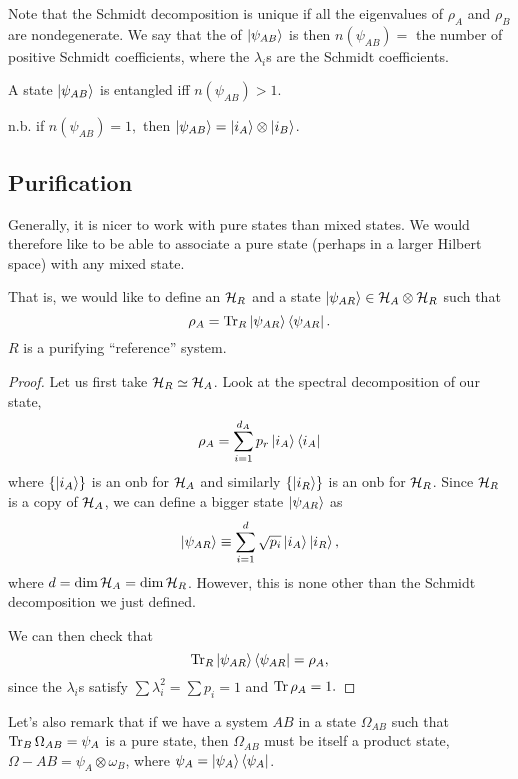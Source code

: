 Note that the Schmidt decomposition is unique if all the eigenvalues of $\rho_A$ and $\rho_B$ are nondegenerate. We say that the  of $\left| \psi_{AB} \right>$ is then $n(\psi_{AB})={}$ the number of positive Schmidt coefficients, where the $\lambda_i$s are the Schmidt coefficients.

\begin{thm}
    A state $\left| \psi_{AB} \right>$ is entangled iff $n(\psi_{AB}) >1$.
\end{thm}
n.b. if $n(\psi_{AB})=1,$ then $\left| \psi_{AB} \right>=\left| i_A \right>\otimes \left| i_B \right>$.

\subsection*{Purification} Generally, it is nicer to work with pure states than mixed states. We would therefore like to be able to associate a pure state (perhaps in a larger Hilbert space) with any mixed state.

That is, we would like to define an $\mathcal H_R$ and a state $\left| \psi_{AR} \right>\in \mathcal H_A \otimes \mathcal H_R$ such that
\begin{equation}
    \rho_A=\operatorname{Tr}_R \left| \psi_{AR} \right>\left< \psi_{AR} \right|.
\end{equation}
$R$ is a purifying ``reference'' system.
\begin{proof}
    Let us first take $\mathcal H_R \simeq \mathcal H_A$. Look at the spectral decomposition of our state,
    \begin{equation}
        \rho_A =\sum_{i=1}^{d_A} p_r \left| i_A \right>\left< i_A \right|
    \end{equation}
    where $\{\left| i_A \right>\}$ is an onb for $\mathcal H_A$ and similarly $\{\left| i_R \right>\}$ is an onb for $\mathcal H_R$. Since $\mathcal H_R$ is a copy of $\mathcal H_A$, we can define a bigger state $\left| \psi_{AR} \right>$ as
    \begin{equation}
        \left| \psi_{AR} \right>\equiv \sum_{i=1}^d \sqrt{p_i}\left| i_A \right> \left| i_R \right>,
    \end{equation}
    where $d=\dim \mathcal H_A = \dim \mathcal H_R$. However, this is none other than the Schmidt decomposition we just defined.
    
    We can then check that
    \begin{equation}
        \operatorname{Tr}_R \left| \psi_{AR} \right>\left< \psi_{AR} \right|= \rho_A,
    \end{equation}
    since the $\lambda_i$s satisfy $\sum \lambda_i^2 =\sum p_i =1$ and $\operatorname{Tr} \rho_A = 1.$
\end{proof}

Let's also remark that if we have a system $AB$ in a state $\Omega_{AB}$ such that $\operatorname{Tr}_B \Omega_{AB}=\psi_A$ is a pure state, then $\Omega_{AB}$ must be itself a product state, $\Omega-{AB}=\psi_A \otimes \omega_B$, where $\psi_A=\left| \psi_A \right>\left< \psi_A \right|$.

